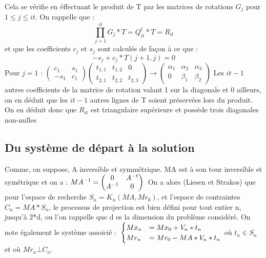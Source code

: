 \documentclass[12 pt]{article}
\begin{document}
Cela se vérifie en éffectuant le produit de T par les matrices de rotations $G_{j}$ pour $1 \leq j \leq it$. On rappelle que :
\[ \prod_{j=1}^{it} G_{j}*T = Q^t_{it}*T = R_{it} \] 
et que les coefficients $c_j$ et $s_j$ sont calculés de façon à ce que :
\[ -s_j    + c_j*T(j+1,j) = 0\]
Pour $ j = 1 $ : 
$ \left (\begin{array}{cc} c_1 & s_1 \\ -s_1 & c_1 \end{array} \right )
  \left (\begin{array}{ccc} t_{1,1} & t_{1,2} & 0 \\ t_{2,1} & t_{2,2} & t_{2,3} \end{array} \right ) 
  \rightarrow 
  \left (\begin{array}{ccc} \alpha_1 & \alpha_2 & \alpha_3 \\ 0 & \beta_1 & \beta_2 \end{array} \right )
$
Les $it -1$ autres coefficients de la matrice de rotation valant 1 sur la diagonale et 0 ailleurs, on en déduit que les $it - 1$ autres lignes de T soient préservées
lors du produit.
On en déduit donc que $R_{it}$ est triangulaire supérieure et possède trois diagonales non-nulles

\subsection*{Du système de départ à la solution}

Comme, on suppose, A inversible et symmétrique. MA est à son tour inversible et symétrique et on a : 
$\\ MA^{-1} = \begin{pmatrix} 0 & A^{-t} \\ A^{-1} & 0 \end{pmatrix} \\ $ 
On a alors (Liesen et Strakos) que pour l'espace de recherche $S_n = K_n(MA,Mr_0)$, et l'espace de contraintes $C_n = MA*S_n$, le processus de projection est bien défini pour tout entier n,
jusqu'à 2*d, ou l'on rappelle que d es la dimension du problème considéré. On note également le système assoicié :
$ \\
\begin{cases}
  Mx_n &= Mx_0 + V_n*t_n   \\
  Mr_n &= Mr_0 - MA*V_n*t_n 
  \end{cases}$
où $t_n \in S_n$ et où $Mr_n \bot C_n$.
\end{document}
